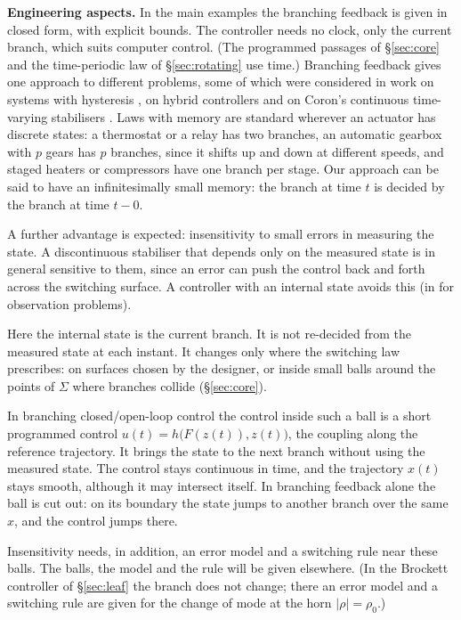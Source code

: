 \documentclass[11pt,reqno]{amsart}
\theoremstyle{plain}
\theoremstyle{definition}
\theoremstyle{remark}
\newcommand{\Sig}{\Sigma}
\begin{document}
\medskip
\noindent\textbf{Engineering aspects.} In the main examples the branching feedback is given in closed form, with explicit bounds. The controller needs no clock, only the current branch, which suits computer control. (The programmed passages of \S\ref{sec:core} and the time-periodic law of \S\ref{sec:rotating} use time.) Branching feedback gives one approach to different problems, some of which were considered in work on systems with hysteresis \cite{KrasnoselskiiPokrovskii1989,Visintin2014}, on hybrid controllers \cite{GoebelSanfeliceTeel2012,Sanfelice2021} and on Coron's continuous time-varying stabilisers \cite{Coron2007}. Laws with memory are standard wherever an actuator has discrete states: a thermostat or a relay has two branches, an automatic gearbox with $p$ gears has $p$ branches, since it shifts up and down at different speeds, and staged heaters or compressors have one branch per stage. Our approach can be said to have an infinitesimally small memory: the branch at time $t$ is decided by the branch at time $t-0$.

A further advantage is expected: insensitivity to small errors in measuring the state. A discontinuous stabiliser that depends only on the measured state is in general sensitive to them, since an error can push the control back and forth across the switching surface. A controller with an internal state avoids this \cite{Shosh1990,Sontag1999} (in \cite[\S6]{Shosh1990} for observation problems).

Here the internal state is the current branch. It is not re-decided from the measured state at each instant. It changes only where the switching law prescribes: on surfaces chosen by the designer, or inside small balls around the points of $\Sig$ where branches collide (\S\ref{sec:core}).

In branching closed/open-loop control \cite[\S3]{Shosh1990} the control inside such a ball is a short programmed control $u(t)=h\bigl(F(z(t)),z(t)\bigr)$, the coupling along the reference trajectory. It brings the state to the next branch without using the measured state. The control stays continuous in time, and the trajectory $x(t)$ stays smooth, although it may intersect itself. In branching feedback alone the ball is cut out: on its boundary the state jumps to another branch over the same $x$, and the control jumps there.

Insensitivity needs, in addition, an error model and a switching rule near these balls. The balls, the model and the rule will be given elsewhere. (In the Brockett controller of \S\ref{sec:leaf} the branch does not change; there an error model and a switching rule are given for the change of mode at the horn $|\rho|=\rho_0$.)
\end{document}

